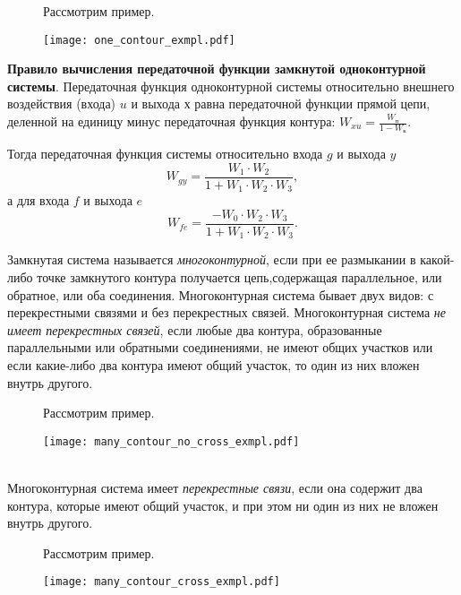 \documentclass[../../TAU.tex]{subfiles}
\begin{document}
    \begin{figure}[h]
        \begin{minipage}[h]{0.29\linewidth}
            Рассмотрим пример.
            \vspace{3cm}
        \end{minipage}
        \begin{minipage}[h]{0.70\linewidth}
            \texttt{[image: one\_contour\_exmpl.pdf]}
        \end{minipage}
    \end{figure}
    {\bf Правило вычисления передаточной функции замкнутой одноконтурной системы}. 
    Передаточная функция одноконтурной системы относительно внешнего воздействия (входа) $u$ и выхода $х$ равна передаточной функции прямой цепи, деленной на единицу минус передаточная функция контура: $W_{xu}=\frac{W_\text{п}}{1-W_\text{к}}$.

    Тогда передаточная функция системы относительно входа $g$ и выхода $y$ 
    $$W_{gy}=\frac{W_1\cdot W_2}{1+W_1\cdot W_2\cdot W_3},$$
    а для входа $f$ и выхода $e$ 
    $$W_{fe}=\frac{-W_0\cdot W_2\cdot W_3}{1+W_1\cdot W_2\cdot W_3}.$$

     Замкнутая система называется {\it многоконтурной}, если при ее размыкании в какой-либо точке замкнутого контура получается цепь,содержащая параллельное, или обратное, или оба соединения. Многоконтурная система бывает двух видов: с перекрестными связями и без перекрестных связей.
    Многоконтурная система {\it не имеет перекрестных связей}, если любые два контура, образованные параллельными или обратными соединениями, не имеют общих участков или если какие-либо два контура имеют общий участок, то один из них вложен внутрь другого.
    \begin{figure}[h]
        \begin{minipage}[h]{0.19\linewidth}
            Рассмотрим пример.
            \vspace{3cm}
        \end{minipage}
        \begin{minipage}[h]{0.80\linewidth}
            \texttt{[image: many\_contour\_no\_cross\_exmpl.pdf]}
        \end{minipage}
    \end{figure}\\
    Многоконтурная система имеет {\it перекрестные связи}, если она содержит два контура, которые имеют общий участок, и при этом ни один из них не вложен внутрь другого.
    \begin{figure}[h]
        \begin{minipage}[h]{0.19\linewidth}
            Рассмотрим пример.
            \vspace{3cm}
        \end{minipage}
        \begin{minipage}[h]{0.80\linewidth}
            \texttt{[image: many\_contour\_cross\_exmpl.pdf]}
        \end{minipage}
    \end{figure}
\end{document}
